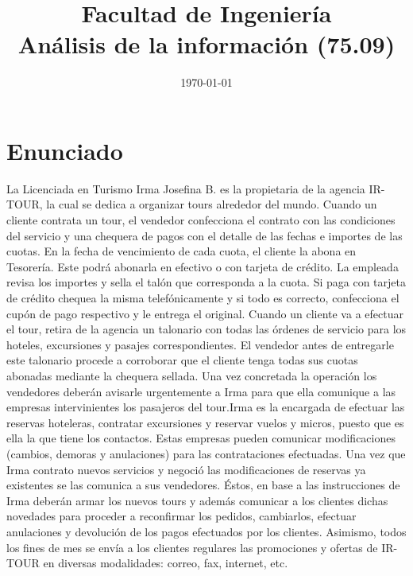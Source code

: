 \documentclass[12pt,a4paper,titlepage,oneside]{article}
\title{Facultad de Ingeniería\\Análisis de la información (75.09)}
\date{\today}
\begin{document}
    \fancyhead[LE]{\leftmark} 
    \fancyhead[RO]{\rightmark} 
    \renewcommand{\headrulewidth}{0.4pt} 
    \renewcommand{\footrulewidth}{0pt}

    \pagestyle{fancy}


 \maketitle
  \setcounter{page}{1}
  \tableofcontents

\newpage{}
\setcounter{page}{1}

\section{Enunciado}

La Licenciada en Turismo Irma Josefina B. es la propietaria de la agencia IR-TOUR, la cual se dedica a organizar tours alrededor del mundo.
Cuando un cliente contrata un tour, el vendedor confecciona el contrato con las condiciones del servicio y una chequera de pagos con el detalle de las fechas e importes de las cuotas.
En la fecha de vencimiento de cada cuota, el cliente la abona en Tesorería. Este podrá abonarla en efectivo o con tarjeta de crédito. La empleada revisa los importes y sella el talón que corresponda a la cuota. Si paga con tarjeta de crédito chequea la misma telefónicamente y si todo es correcto, confecciona el cupón de pago respectivo y le entrega el original. Cuando un cliente va a efectuar el tour, retira de la agencia un talonario con todas las órdenes de servicio para los hoteles, excursiones y pasajes correspondientes. El vendedor antes de entregarle este talonario procede a corroborar que el cliente tenga todas sus cuotas abonadas mediante la chequera sellada. Una vez concretada la operación los vendedores deberán avisarle urgentemente a Irma para que ella comunique a las empresas intervinientes los pasajeros del tour.Irma es la encargada de efectuar las reservas hoteleras, contratar excursiones y reservar vuelos y micros, puesto que es ella la que tiene los contactos. Estas empresas pueden comunicar modificaciones (cambios, demoras y anulaciones) para las contrataciones efectuadas. Una vez que Irma contrato nuevos servicios y negoció las modificaciones de reservas ya existentes se las comunica a sus vendedores. Éstos, en base a las instrucciones de Irma deberán armar los nuevos tours y además comunicar a los clientes dichas novedades para proceder a reconfirmar los pedidos, cambiarlos, efectuar anulaciones y devolución de los pagos efectuados por los clientes.
Asimismo, todos los fines de mes se envía a los clientes regulares las promociones y ofertas de IR-TOUR en diversas modalidades: correo, fax, internet, etc.
\end{document}
